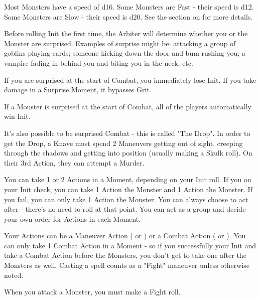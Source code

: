 {  Most Monsters have a speed of d16.  Some Monsters are Fast - their speed is d12.  Some Monsters are Slow - their speed is d20.  See the section on  for more details.



  Before rolling Init the first time, the Arbiter will determine whether you or the Monster are surprised. Examples of surprise might be: attacking a group of goblins playing cards; someone kicking down the door and bum rushing you; a vampire fading in behind you and biting you in the neck; etc.

  If you are surprised at the start of Combat, you immediately lose Init. If you take damage in a Surprise Moment, it bypasses Grit.

  If a Monster is surprised at the start of Combat, all of the players automatically win Init.

  It's also possible to be surprised  Combat - this is called "The Drop".  In order to get the Drop, a Knave must spend 2 Maneuvers getting out of sight, creeping through the shadows and getting into position (usually making a Skulk roll).  On their 3rd Action, they can attempt a Murder.


  You can take 1 or 2 Actions in a Moment, depending on your Init roll. If you \RO on your Init check, you can take 1 Action  the Monster and 1 Action  the Monster. If you fail, you can only take 1 Action  the Monster. You can always choose to act after - there's no need to roll at that point. You can act as a group and decide your own order for Actions in each Moment. 

  Your Actions can be a Maneuver Action ( or ) or a Combat Action ( or ).  You can only take 1 Combat Action in a Moment - so if you successfully \RO your Init and take a Combat Action before the Monsters, you don't get to take one after the Monsters as well.  Casting a spell counts as a "Fight" maneuver unless otherwise noted.




  When you attack a Monster, you must make a Fight roll.

}
